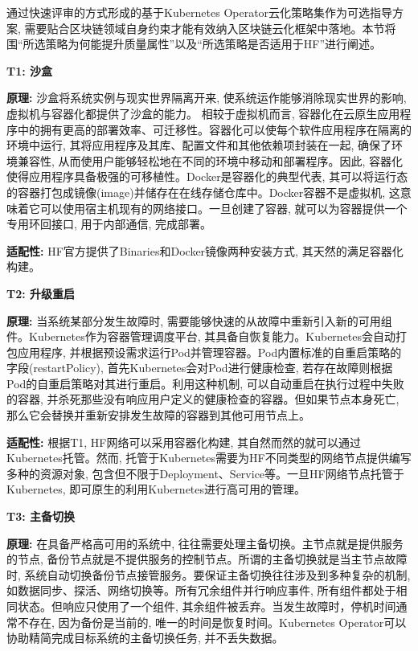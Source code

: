 通过快速评审的方式形成的基于Kubernetes Operator云化策略集作为可选指导方案, 需要贴合区块链领域自身约束才能有效纳入区块链云化框架中落地。本节将围“所选策略为何能提升质量属性”以及“所选策略是否适用于HF”进行阐述。

\textbf{T1: 沙盒}

\textbf{原理: }沙盒将系统实例与现实世界隔离开来, 使系统运作能够消除现实世界的影响, 虚拟机与容器化都提供了沙盒的能力。 相较于虚拟机而言, 容器化在云原生应用程序中的拥有更高的部署效率\cite{zhou2021container}、可迁移性。容器化可以使每个软件应用程序在隔离的环境中运行, 其将应用程序及其库、配置文件和其他依赖项封装在一起, 确保了环境兼容性, 从而使用户能够轻松地在不同的环境中移动和部署程序。因此, 容器化使得应用程序具备极强的可移植性。Docker\footnotemark[1]是容器化的典型代表, 其可以将运行态的容器打包成镜像(image)并储存在在线存储仓库中。Docker容器不是虚拟机, 这意味着它可以使用宿主机现有的网络接口\cite{shah2019building}。一旦创建了容器, 就可以为容器提供一个专用环回接口, 用于内部通信, 完成部署。

\textbf{适配性: }HF官方提供了Binaries和Docker镜像两种安装方式\footnotemark[2], 其天然的满足容器化构建。

\textbf{T2: 升级重启}

\textbf{原理: }当系统某部分发生故障时, 需要能够快速的从故障中重新引入新的可用组件。Kubernetes作为容器管理调度平台, 其具备自恢复能力。Kubernetes会自动打包应用程序, 并根据预设需求运行Pod并管理容器。Pod内置标准的自重启策略的字段(restartPolicy), 首先Kubernetes会对Pod进行健康检查, 若存在故障则根据Pod的自重启策略对其进行重启。利用这种机制, 可以自动重启在执行过程中失败的容器, 并杀死那些没有响应用户定义的健康检查的容器。但如果节点本身死亡, 那么它会替换并重新安排发生故障的容器到其他可用节点上。

\textbf{适配性: }根据T1, HF网络可以采用容器化构建, 其自然而然的就可以通过Kubernetes托管。然而, 托管于Kubernetes需要为HF不同类型的网络节点提供编写多种的资源对象, 包含但不限于Deployment、Service等。一旦HF网络节点托管于Kubernetes, 即可原生的利用Kubernetes进行高可用的管理。


\textbf{T3: 主备切换}

\textbf{原理: } 在具备严格高可用的系统中, 往往需要处理主备切换。主节点就是提供服务的节点, 备份节点就是不提供服务的控制节点。所谓的主备切换就是当主节点故障时, 系统自动切换备份节点接管服务。要保证主备切换往往涉及到多种复杂的机制, 如数据同步、探活、网络切换等。所有冗余组件并行响应事件, 所有组件都处于相同状态。但响应只使用了一个组件, 其余组件被丢弃。当发生故障时，停机时间通常不存在, 因为备份是当前的, 唯一的时间是恢复时间。Kubernetes Operator可以协助精简完成目标系统的主备切换任务, 并不丢失数据。

